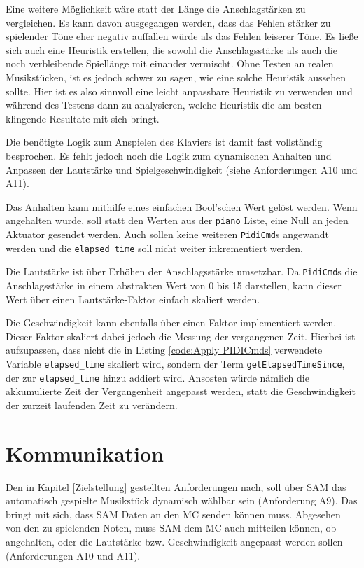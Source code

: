 Eine weitere Möglichkeit wäre statt der Länge die Anschlagstärken zu vergleichen.
Es kann davon ausgegangen werden, dass das Fehlen stärker zu spielender Töne eher negativ auffallen würde als das Fehlen leiserer Töne. \newline
Es ließe sich auch eine Heuristik erstellen, die sowohl die Anschlagsstärke als auch die noch verbleibende Spiellänge mit einander vermischt.
Ohne Testen an realen Musikstücken, ist es jedoch schwer zu sagen, wie eine solche Heuristik aussehen sollte.
Hier ist es also sinnvoll eine leicht anpassbare Heuristik zu verwenden und während des Testens dann zu analysieren, welche Heuristik die am besten klingende Resultate mit sich bringt.

Die benötigte Logik zum Anspielen des Klaviers ist damit fast vollständig besprochen.
Es fehlt jedoch noch die Logik zum dynamischen Anhalten und Anpassen der Lautstärke und Spielgeschwindigkeit (siehe Anforderungen A10 und A11).

Das Anhalten kann mithilfe eines einfachen Bool'schen Wert gelöst werden.
Wenn angehalten wurde, soll statt den Werten aus der \lstinline{piano} Liste, eine Null an jeden Aktuator gesendet werden.
Auch sollen keine weiteren \lstinline{PidiCmd}s angewandt werden und die \lstinline|elapsed_time| soll nicht weiter inkrementiert werden.

Die Lautstärke ist über Erhöhen der Anschlagsstärke umsetzbar.
Da \lstinline{PidiCmd}s die Anschlagsstärke in einem abstrakten Wert von 0 bis 15 darstellen, kann dieser Wert über einen Lautstärke-Faktor einfach skaliert werden.

Die Geschwindigkeit kann ebenfalls über einen Faktor implementiert werden.
Dieser Faktor skaliert dabei jedoch die Messung der vergangenen Zeit.
Hierbei ist aufzupassen, dass nicht die in Listing \ref{code:Apply PIDICmds} verwendete Variable \lstinline{elapsed_time} skaliert wird, sondern der Term \lstinline{getElapsedTimeSince}, der zur \lstinline{elapsed_time} hinzu addiert wird. \newline
Ansosten würde nämlich die akkumulierte Zeit der Vergangenheit angepasst werden, statt die Geschwindigkeit der zurzeit laufenden Zeit zu verändern.


\section{Kommunikation} \label{vorgehenSW-SPPP}

Den in Kapitel \ref{Zielstellung} gestellten Anforderungen nach, soll über \ac{SAM} das automatisch gespielte Musikstück dynamisch wählbar sein (Anforderung A9).
Das bringt mit sich, dass \ac{SAM} Daten an den \ac{MC} senden können muss. \newline
Abgesehen von den zu spielenden Noten, muss \ac{SAM} dem \ac{MC} auch mitteilen können, ob angehalten, oder die Lautstärke bzw. Geschwindigkeit angepasst werden sollen (Anforderungen A10 und A11).

